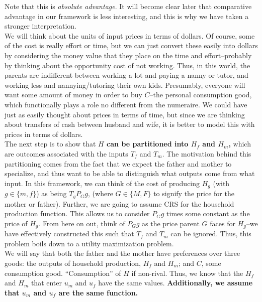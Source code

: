 \documentclass[12pt]{paper}
\begin{document}
Note that this is \textit{absolute advantage}. It will become clear
later that comparative advantage in our framework is less interesting,
and this is why we have taken a stronger interpretation.
\\

We will think about the units of input prices in terms of dollars. Of
course, some of the cost is really effort or time, but we can just
convert these easily into dollars by considering the money value that
they place on the time and effort--probably by thinking about the
opportunity cost of not working. Thus, in this world, the parents are
indifferent between working a lot and paying a nanny or tutor, and
working less and nannying/tutoring their own kids. Presumably,
everyone will want some amount of money in order to buy $C$--the
personal consumption good, which functionally plays a role no
different from the numeraire. We could have just as easily thought
about prices in terms of time, but since we are thinking about
transfers of cash between husband and wife, it is better to model this
with prices in terms of dollars.
\\

The next step is to show that \textbf{$H$ can be partitioned into
  $H_f$ and $H_m$,} which are outcomes associated with the inputs
$T_f$ and $T_m$. The motivation behind this partitioning comes from
the fact that we expect the father and mother to specialize, and thus
want to be able to distinguish what outputs come from what input. In
this framework, we can think of the cost of producing $H_g$ (with
$g\in\{m,f\}$) as being $T_gP_Gg$, (where $G\in\{M,F\}$ to signify the
price for the mother or father). Further, we are going to assume CRS
for the household production function. This allows us to consider
$P_Gg$ times some constant as the price of $H_g$. From here on out,
think of $P_Gg$ as the price parent $G$ faces for $H_g$--we have
effectively constructed this such that $T_f$ and $T_m$ can be
ignored. Thus, this problem boils down to a utility maximization
problem.
\\

We will say that both the father and the mother have preferences over
three goods: the outputs of household production, $H_f$ and $H_m$; and
$C$, some consumption good. ``Consumption'' of $H$ if non-rival. Thus,
we know that the $H_f$ and $H_m$ that enter $u_m$ and $u_f$ have the
same values. \textbf{Additionally, we assume that $u_m$ and $u_f$ are
  the same function.}
\\
\end{document}
